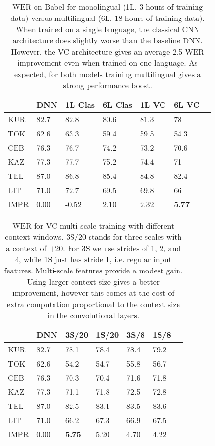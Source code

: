 \documentclass{article}
\begin{document}
\begin{table}[ht]
\centering
\begin{tabular}{l | l | lllll}
     & DNN  & 1L Clas    & 6L Clas    & 1L VC  & 6L VC  \\ \hline
KUR      & 82.7 & 82.8    & 80.6    & 81.3  & 78    \\
TOK      & 62.6 & 63.3    & 59.4    & 59.5  & 54.3  \\
CEB      & 76.3 & 76.7    & 74.2    & 73.2  & 70.6  \\
KAZ      & 77.3 & 77.7    & 75.2    & 74.4  & 71    \\
TEL      & 87.0 & 86.8    & 85.4    & 84.8  & 82.4  \\
LIT      & 71.0 & 72.7    & 69.5    & 69.8  & 66    \\ \hline
IMPR     & 0.00 & -0.52   & 2.10    & 2.32  & \bf{5.77}
\end{tabular}
\caption{\label{tab:multiling}WER on Babel for monolingual (1L, 3 hours of training data) versus 
    multilingual (6L, 18 hours of training data).
    When trained on a single language, the classical CNN architecture does slightly worse than the baseline DNN.
    However, the VC architecture gives an average 2.5 WER improvement even when trained on one language.
    As expected, for both models training multilingual gives a strong performance boost.}
\end{table}

\begin{table}[ht]
\centering
\begin{tabular}{l | l | lllll}
     & DNN  & 3S/20 & 1S/20 & 3S/8 & 1S/8 \\ \hline
KUR  & 82.7 & 78.1  & 78.4  & 78.4 & 79.2 \\
TOK  & 62.6 & 54.2  & 54.7  & 55.8 & 56.7 \\
CEB  & 76.3 & 70.3  & 70.4  & 71.6 & 71.8 \\
KAZ  & 77.3 & 71.1  & 71.8  & 72.5 & 72.8 \\
TEL  & 87.0 & 82.5  & 83.1  & 83.5 & 83.6 \\
LIT  & 71.0 & 66.2  & 67.3  & 66.9 & 67.5 \\ \hline
IMPR & 0.00 & \bf{5.75}  & 5.20  & 4.70 & 4.22
\end{tabular}
\caption{\label{tab:multiscale}WER for VC multi-scale training with different context windows.
    3S/20 stands for three scales with a context of $\pm$20.
    For 3S we use strides of 1, 2, and 4, while 1S just has stride 1, i.e. regular input features.
    Multi-scale features provide a modest gain. 
    Using larger context size gives a better improvement, however this comes
    at the cost of extra computation proportional to the context size in the convolutional layers.}
\end{table}
\end{document}
